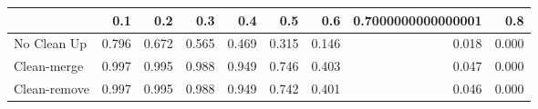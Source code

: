 \begin{tabular}{lrrrrrrrr}
\toprule
{} &   0.1 &   0.2 &   0.3 &   0.4 &   0.5 &   0.6 & 0.7000000000000001 &   0.8 \\
\midrule
No Clean Up  & 0.796 & 0.672 & 0.565 & 0.469 & 0.315 & 0.146 &              0.018 & 0.000 \\
Clean-merge  & 0.997 & 0.995 & 0.988 & 0.949 & 0.746 & 0.403 &              0.047 & 0.000 \\
Clean-remove & 0.997 & 0.995 & 0.988 & 0.949 & 0.742 & 0.401 &              0.046 & 0.000 \\
\bottomrule
\end{tabular}
